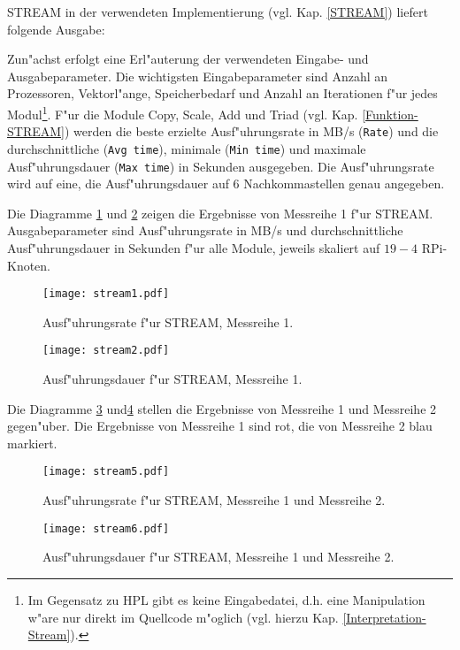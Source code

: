 STREAM in der verwendeten Implementierung (vgl. Kap. \ref{STREAM}) liefert folgende Ausgabe:

Zun"achst erfolgt eine Erl"auterung der verwendeten Eingabe- und Ausgabeparameter. Die wichtigsten Eingabeparameter sind Anzahl an Prozessoren, Vektorl"ange, Speicherbedarf und Anzahl an Iterationen f"ur jedes Modul\footnote{Im Gegensatz zu HPL gibt es keine Eingabedatei, d.h. eine Manipulation w"are nur direkt im Quellcode m"oglich (vgl. hierzu Kap. \ref{Interpretation-Stream}).}. F"ur die Module Copy, Scale, Add und Triad (vgl. Kap. \ref{Funktion-STREAM}) werden die beste erzielte Ausf"uhrungsrate in MB/s (\texttt{Rate}) und die durchschnittliche (\texttt{Avg time}), minimale (\texttt{Min time}) und maximale Ausf"uhrungsdauer (\texttt{Max time}) in Sekunden ausgegeben. Die Ausf"uhrungsrate wird auf eine, die Ausf"uhrungsdauer auf 6 Nachkommastellen genau angegeben. 

Die Diagramme \ref{fig:stream1} und \ref{fig:stream2} zeigen die Ergebnisse von Messreihe 1 f"ur STREAM. Ausgabeparameter sind Ausf"uhrungsrate in MB/s und durchschnittliche Ausf"uhrungsdauer in Sekunden f"ur alle Module, jeweils skaliert auf $19-4$ RPi-Knoten. 
\begin{figure}[htb]
  \centering
  \texttt{[image: stream1.pdf]}\\ 
  \caption{Ausf"uhrungsrate f"ur STREAM, Messreihe 1.}
  \label{fig:stream1}		
\end{figure}
\begin{figure}[htb]
  \centering
  \texttt{[image: stream2.pdf]}\\ 
  \caption{Ausf"uhrungsdauer f"ur STREAM, Messreihe 1.}
  \label{fig:stream2}		
\end{figure}

\noindent
Die Diagramme \ref{fig:stream5} und\ref{fig:stream6} stellen die Ergebnisse von Messreihe 1 und Messreihe 2 gegen"uber. Die Ergebnisse von Messreihe 1 sind rot, die von Messreihe 2 blau markiert. 
\begin{figure}[htb]
  \centering
  \texttt{[image: stream5.pdf]}\\ 
  \caption{Ausf"uhrungsrate f"ur STREAM, Messreihe 1 und Messreihe 2.}\label{fig:stream5}
\end{figure}
\begin{figure}[htb]
  \centering
  \texttt{[image: stream6.pdf]}\\ 
  \caption{Ausf"uhrungsdauer f"ur STREAM, Messreihe 1 und Messreihe 2.}\label{fig:stream6}
\end{figure}

